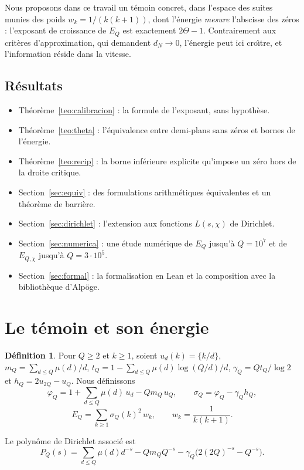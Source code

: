 \documentclass[11pt,a4paper]{amsart}
\theoremstyle{definition}
\newtheorem{definicion}[teorema]{D\'efinition}
\theoremstyle{remark}
\begin{document}
Nous proposons dans ce travail un t\'emoin concret, dans l'espace des suites munies des poids $w_k=1/(k(k+1))$, dont l'\'energie \emph{mesure} l'abscisse des z\'eros : l'exposant de croissance de $E_Q$ est exactement $2\Theta-1$. Contrairement aux crit\`eres d'approximation, qui demandent $d_N\to0$, l'\'energie peut ici cro\^{\i}tre, et l'information r\'eside dans la vitesse.

\subsection*{R\'esultats}
\begin{itemize}
\item Th\'eor\`eme~\ref{teo:calibracion} : la formule de l'exposant, sans hypoth\`ese.
\item Th\'eor\`eme~\ref{teo:theta} : l'\'equivalence entre demi-plans sans z\'eros et bornes de l'\'energie.
\item Th\'eor\`eme~\ref{teo:recip} : la borne inf\'erieure explicite qu'impose un z\'ero hors de la droite critique.
\item Section~\ref{sec:equiv} : des formulations arithm\'etiques \'equivalentes et un th\'eor\`eme de barri\`ere.
\item Section~\ref{sec:dirichlet} : l'extension aux fonctions $L(s,\chi)$ de Dirichlet.
\item Section~\ref{sec:numerica} : une \'etude num\'erique de $E_Q$ jusqu'\`a $Q=10^7$ et de $E_{Q,\chi}$ jusqu'\`a $Q=3\cdot10^5$.
\item Section~\ref{sec:formal} : la formalisation en Lean et la composition avec la biblioth\`eque d'Alp\"oge.
\end{itemize}

\section{Le t\'emoin et son \'energie}

\begin{definicion}
Pour $Q\ge2$ et $k\ge1$, soient $u_d(k)=\{k/d\}$, $m_Q=\sum_{d\le Q}\mu(d)/d$, $t_Q=1-\sum_{d\le Q}\mu(d)\log(Q/d)/d$, $\gamma_Q=Qt_Q/\log2$ et $h_Q=2u_{2Q}-u_Q$. Nous d\'efinissons
\[
\varphi_Q=1+\sum_{d\le Q}\mu(d)\,u_d-Qm_Q\,u_Q,\qquad
\sigma_Q=\varphi_Q-\gamma_Q h_Q,
\]
\[
E_Q=\sum_{k\ge1}\sigma_Q(k)^2\,w_k,\qquad w_k=\frac1{k(k+1)}.
\]
\end{definicion}

Le polyn\^ome de Dirichlet associ\'e est
\[
P_Q(s)=\sum_{d\le Q}\mu(d)d^{-s}-Qm_QQ^{-s}-\gamma_Q\bigl(2(2Q)^{-s}-Q^{-s}\bigr).
\]
\end{document}
